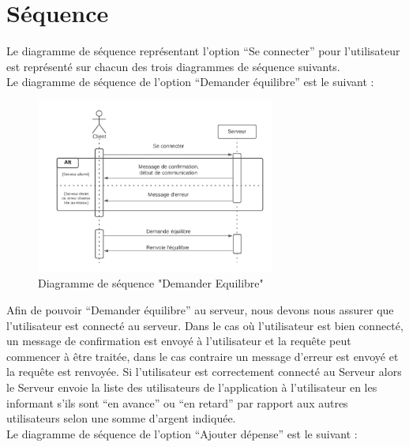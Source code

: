 \documentclass[12,french]{report}
\begin{document}
\section{Séquence}

Le diagramme de séquence représentant l’option “Se connecter” pour l’utilisateur est représenté sur chacun des trois diagrammes de séquence suivants.\\

Le diagramme de séquence de l’option “Demander équilibre” est le suivant :\\

\begin{figure}[H]
	\center
	\includegraphics[width=0.7\textwidth]{./Images/Sequence_1}
	\caption{Diagramme de séquence "Demander Equilibre"}
\end{figure}\vspace{0.2cm}

Afin de pouvoir “Demander équilibre” au serveur, nous devons nous assurer que l’utilisateur est connecté au serveur. Dans le cas où l’utilisateur est bien connecté, un message de confirmation est envoyé à l’utilisateur et la requête peut commencer à être traitée, dans le cas contraire un message d’erreur est envoyé et la requête est renvoyée. Si l’utilisateur est correctement connecté au Serveur alors le Serveur envoie la liste des utilisateurs de l’application à l’utilisateur en les informant s’ils sont “en avance” ou “en retard” par rapport aux autres utilisateurs selon une somme d’argent indiquée.\\


Le diagramme de séquence de l’option “Ajouter dépense” est le suivant :\\
\end{document}
